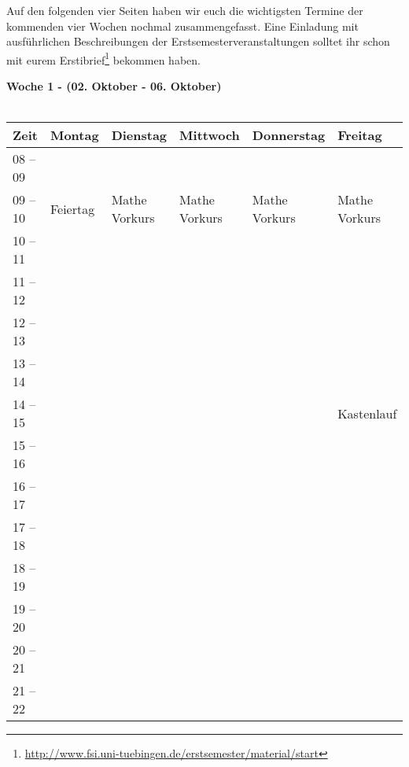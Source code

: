 Auf den folgenden vier Seiten haben wir euch die wichtigsten Termine der kommenden vier Wochen nochmal zusammengefasst. Eine Einladung mit ausführlichen Beschreibungen der Erstsemesterveranstaltungen solltet ihr schon mit eurem Erstibrief\footnote{\url{http://www.fsi.uni-tuebingen.de/erstsemester/material/start}} bekommen haben.
\vfill




\textbf{Woche 1 - (02. Oktober - 06. Oktober)}\\
\\
\begin{tabular}{|l|p{}|p{}|p{}|p{}|p{}|} \hline
 Zeit & Montag & Dienstag & Mittwoch & Donnerstag & Freitag \\ 
 \hline \hline
 08 -- 09 & & & & & \\ \cline{1-1} 
\cline{2-6}
 09 -- 10 &\footnotesize{Feiertag} & \footnotesize{Mathe Vorkurs} &\footnotesize{Mathe Vorkurs} & \footnotesize{Mathe Vorkurs} & \footnotesize{Mathe Vorkurs} \\ \cline{1-1}
 10 -- 11 & & & & & \\ \cline{1-1}
 11 -- 12 & & & & & \\ \cline{1-1}
 12 -- 13 & & & & & \\ \cline{1-1} 
 13 -- 14 & & & & & \\ \cline{1-1} \cline{6-6}
 14 -- 15 & & & & & \cellcolor{lightlightgray} \footnotesize{Kastenlauf}\\ \cline{1-1}
 15 -- 16 & & & & & \ \cellcolor{lightlightgray} \\ \cline{1-5}
 16 -- 17 & & & & &  \cellcolor{lightlightgray}\\ \cline{1-1}
 17 -- 18 & & & & & \cellcolor{lightlightgray}\\ \cline{1-1} \cline{6-6}	
 18 -- 19 & & & & & \\ \cline{1-1}
 19 -- 20 & & & & &   \\ \cline{1-1}
 20 -- 21 & & & &  &  \\ \cline{1-1}
 21 -- 22 & & & & & \\ \hline
 \end{tabular}
\vfil

